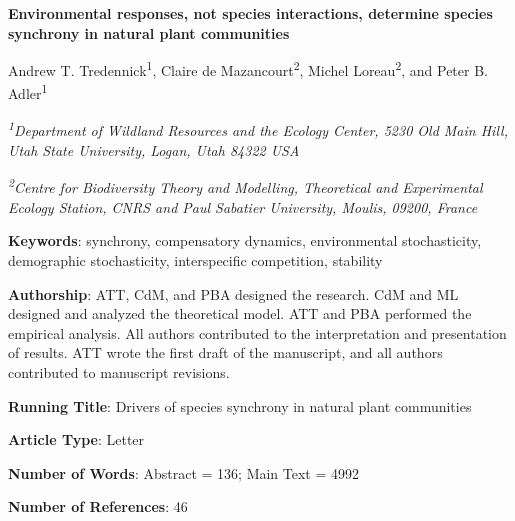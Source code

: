 \documentclass[12pt,]{article}
\title{}
\author{}
\date{}
\begin{document}
\maketitle


\begin{singlespace}

\begin{center}
\large{\textbf{Environmental responses, not species interactions, determine species synchrony in natural plant communities}}

\renewcommand*{\thefootnote}{\fnsymbol{footnote}}

\vspace{1em}

\normalsize{Andrew T. Tredennick\textsuperscript{1}, Claire de Mazancourt\textsuperscript{2}, Michel Loreau\textsuperscript{2}, and Peter B. Adler\textsuperscript{1}}

\vspace{1em}

\textit{\small{\textsuperscript{1}Department of Wildland Resources and the Ecology Center, 5230 Old Main Hill, Utah State University, Logan, Utah 84322 USA}}

\textit{\small{\textsuperscript{2}Centre for Biodiversity Theory and Modelling, Theoretical and Experimental Ecology Station, CNRS and Paul Sabatier University, Moulis, 09200, France}}

\end{center}

\vspace{2em}

\textbf{Keywords}: synchrony, compensatory dynamics, environmental stochasticity, demographic stochasticity, interspecific competition, stability

\vspace{2em}

\textbf{Authorship}: ATT, CdM, and PBA designed the research. CdM and ML designed and analyzed the theoretical model. ATT and PBA performed the empirical analysis. All authors contributed to the interpretation and presentation of results. ATT wrote the first draft of the manuscript, and all authors contributed to manuscript revisions.

\textbf{Running Title}: Drivers of species synchrony in natural plant communities

\textbf{Article Type}: Letter

\textbf{Number of Words}: Abstract = 136; Main Text = 4992

\textbf{Number of References}: 46


\end{singlespace}
\end{document}
